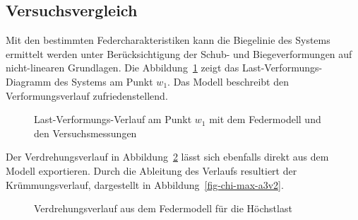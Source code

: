 \documentclass[
  11pt,
  letterpaper,
]{scrreprt}
\begin{document}
\subsection{Versuchsvergleich}\label{versuchsvergleich}

Mit den bestimmten Federcharakteristiken kann die Biegelinie des Systems
ermittelt werden unter Berücksichtigung der Schub- und Biegeverformungen
auf nicht-linearen Grundlagen. Die Abbildung~\ref{fig-fwa3v2} zeigt das
Last-Verformungs-Diagramm des Systems am Punkt \(w_1\). Das Modell
beschreibt den Verformungsverlauf zufriedenstellend.

\begin{figure}[H]


\caption{\label{fig-fwa3v2}Last-Verformungs-Verlauf am Punkt \(w_1\) mit
dem Federmodell und den Versuchsmessungen}

\end{figure}%

Der Verdrehungsverlauf in Abbildung~\ref{fig-phi-max-a3v2} lässt sich
ebenfalls direkt aus dem Modell exportieren. Durch die Ableitung des
Verlaufs resultiert der Krümmungsverlauf, dargestellt in
Abbildung~\ref{fig-chi-max-a3v2}.

\begin{figure}[H]


\caption{\label{fig-phi-max-a3v2}Verdrehungsverlauf aus dem Federmodell
für die Höchstlast}

\end{figure}%
\end{document}
